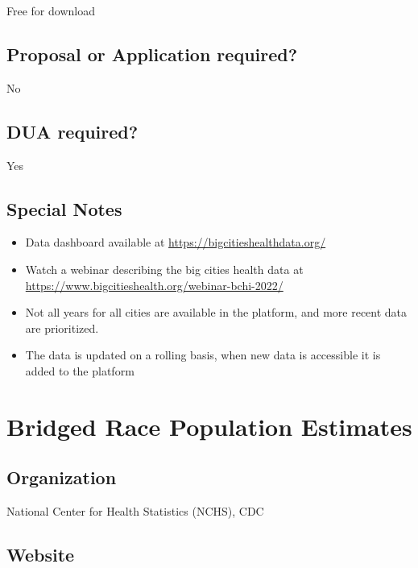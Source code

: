 \documentclass[
]{book}
\providecommand{\tightlist}{%
  \setlength{\itemsep}{0pt}\setlength{\parskip}{0pt}}
\begin{document}
Free for download

\hypertarget{proposal-or-application-required-12}{%
\section{Proposal or Application required?}\label{proposal-or-application-required-12}}

No

\hypertarget{dua-required-12}{%
\section{DUA required?}\label{dua-required-12}}

Yes

\hypertarget{special-notes-12}{%
\section{Special Notes}\label{special-notes-12}}

\begin{itemize}
\tightlist
\item
  Data dashboard available at \url{https://bigcitieshealthdata.org/}
\item
  Watch a webinar describing the big cities health data at \url{https://www.bigcitieshealth.org/webinar-bchi-2022/}
\item
  Not all years for all cities are available in the platform, and more recent data are prioritized.
\item
  The data is updated on a rolling basis, when new data is accessible it is added to the platform
\end{itemize}

\mainmatter

\hypertarget{bridged-race-population-estimates}{%
\chapter{Bridged Race Population Estimates}\label{bridged-race-population-estimates}}

\hypertarget{organization-13}{%
\section{Organization}\label{organization-13}}

National Center for Health Statistics (NCHS), CDC

\hypertarget{website-13}{%
\section{Website}\label{website-13}}
\end{document}
